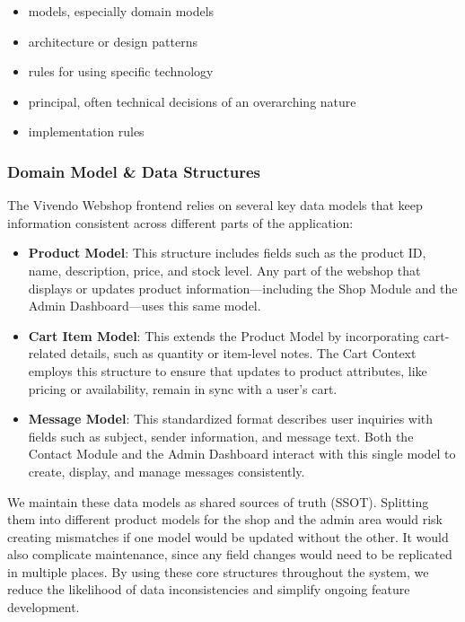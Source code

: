 \begin{itemize}
\item
  models, especially domain models
\item
  architecture or design patterns
\item
  rules for using specific technology
\item
  principal, often technical decisions of an overarching nature
\item
  implementation rules
\end{itemize}

\subsubsection{Domain Model \& Data Structures}
The Vivendo Webshop frontend relies on several key data models that keep information consistent across different parts of the application:

\begin{itemize}
  \item \textbf{Product Model}: This structure includes fields such as the product ID, name, description, price, and stock level. Any part of the webshop that displays or updates product information---including the Shop Module and the Admin Dashboard---uses this same model.
  
  \item \textbf{Cart Item Model}: This extends the Product Model by incorporating cart-related details, such as quantity or item-level notes. The Cart Context employs this structure to ensure that updates to product attributes, like pricing or availability, remain in sync with a user's cart.
  
  \item \textbf{Message Model}: This standardized format describes user inquiries with fields such as subject, sender information, and message text. Both the Contact Module and the Admin Dashboard interact with this single model to create, display, and manage messages consistently.
\end{itemize}

We maintain these data models as shared sources of truth (SSOT). Splitting them into different product models for the shop and the admin area would risk creating mismatches if one model would be updated without the other. It would also complicate maintenance, since any field changes would need to be replicated in multiple places. By using these core structures throughout the system, we reduce the likelihood of data inconsistencies and simplify ongoing feature development.

